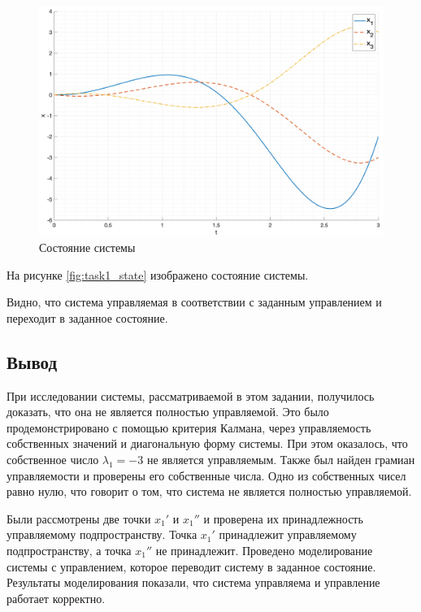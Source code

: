 \begin{figure}
    \centering
    \includegraphics[width=\textwidth]{media/plots/task2_states.png}
    \caption{Состояние системы}
    \label{fig:task2_state}
\end{figure}
На рисунке \ref{fig:task1_state} изображено состояние системы.

Видно, что система управляемая в соответствии с заданным управлением и переходит в заданное состояние. 

\subsection{Вывод}
При исследовании системы, рассматриваемой в этом задании, получилось доказать, что она 
не является полностью управляемой. Это было продемонстрировано с помощью критерия Калмана,
через управляемость собственных значений и диагональную форму системы. При этом оказалось, 
что собственное число $\lambda_1 = -3$ не является управляемым. Также был найден грамиан
управляемости и проверены его собственные числа. Одно из собственных чисел равно нулю, что
говорит о том, что система не является полностью управляемой. 

Были рассмотрены две точки $x_1'$ и $x_1''$ и проверена их принадлежность управляемому
подпространству. Точка $x_1'$ принадлежит управляемому подпространству, а точка $x_1''$ не принадлежит. 
Проведено моделирование системы с управлением, которое переводит систему в заданное состояние.
Результаты моделирования показали, что система управляема и управление работает корректно.